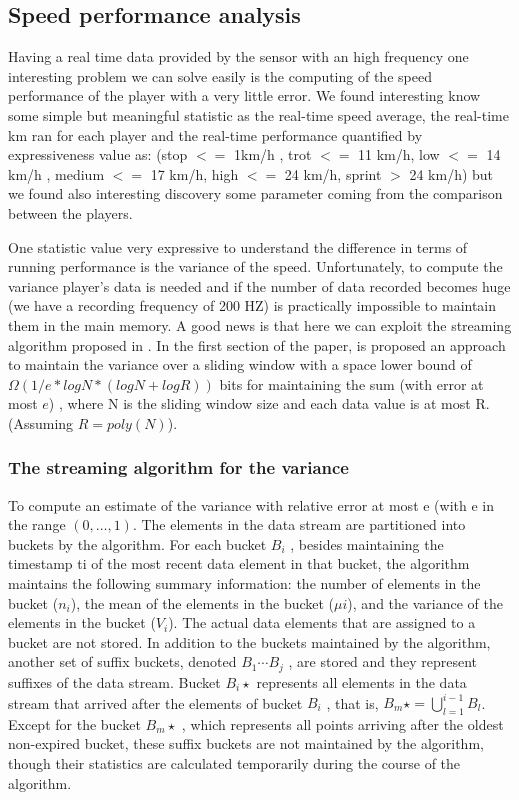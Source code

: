\documentclass{acm_proc_article-sp-sigmod07}
\begin{document}
\subsection{Speed performance analysis}
Having a real time data provided by the sensor with an high frequency one interesting problem we can solve easily is the computing of the speed performance of the player with a very little error. We found interesting know some simple but meaningful statistic as the real-time speed average, the real-time km ran for each player and the real-time performance quantified by expressiveness value as:  (stop $<=$ 1km/h , trot $<=$  11 km/h,  low $<=$ 14 km/h , medium $<=$ 17 km/h,  high $<=$ 24 km/h, sprint $>$ 24 km/h) but we found also interesting discovery some parameter coming from the comparison between the players. 

One statistic value very expressive to understand the difference in terms of running performance is the variance of the speed. Unfortunately, to compute the variance player’s data is needed and if the number of data recorded becomes huge (we have a recording frequency of 200 HZ) is practically impossible to maintain them in the main memory. A good news is that here we can exploit the streaming algorithm proposed in \cite{babcock2003maintaining}. In the first section of the paper, is proposed an approach to maintain the variance over a sliding window with a space lower bound of $\Omega( 1/e* log N *(log N + log R))$ bits for maintaining the sum (with error at most $e$) , where N is the sliding window size and each data value is at most R. (Assuming $R = poly(N)$).

\subsubsection{The streaming algorithm for the variance}
To compute an estimate of the variance with relative error at most e (with e in the range $(0, \ldots, 1)$. The elements in the data stream are partitioned into buckets by the algorithm. For each bucket $B_i$ , besides maintaining the timestamp ti of the most recent data element in that bucket, the algorithm maintains the following summary information: the number of elements in the bucket ($n_i$), the mean of the elements in the bucket ($\mu i$), and the variance of the elements in the bucket ($V_i$). The actual data elements that are assigned to a bucket are not stored. In addition to the buckets maintained by the algorithm, another set of suffix buckets, denoted $B_1 \cdots B_j$ , are stored and they represent suffixes of the data stream. Bucket $B_i\star$ represents all elements in the data stream that arrived after the elements of bucket $B_i$ , that is, $B_m\star = \bigcup _{l=1}^{i-1}B_l$. Except for the bucket $B_m\star$ , which represents all points arriving after the oldest non-expired bucket, these suffix buckets are not maintained by the algorithm, though their statistics are calculated temporarily during the course of the algorithm.
\end{document}
